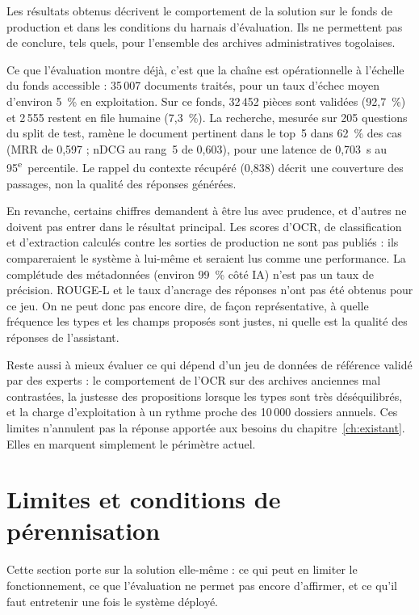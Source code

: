 Les résultats obtenus décrivent le comportement de la solution sur le fonds de production et dans les conditions du harnais d'évaluation. Ils ne permettent pas de conclure, tels quels, pour l'ensemble des archives administratives togolaises.

Ce que l'évaluation montre déjà, c'est que la chaîne est opérationnelle à l'échelle du fonds accessible : 35\,007 documents traités, pour un taux d'échec moyen d'environ 5~\% en exploitation. Sur ce fonds, 32\,452 pièces sont validées (92,7~\%) et 2\,555 restent en file humaine (7,3~\%). La recherche, mesurée sur 205 questions du split de test, ramène le document pertinent dans le top~5 dans 62~\% des cas (MRR de 0,597 ; nDCG au rang~5 de 0,603), pour une latence de 0,703~s au 95\textsuperscript{e}~percentile. Le rappel du contexte récupéré (0,838) décrit une couverture des passages, non la qualité des réponses générées.

En revanche, certains chiffres demandent à être lus avec prudence, et d'autres ne doivent pas entrer dans le résultat principal. Les scores d'OCR, de classification et d'extraction calculés contre les sorties de production ne sont pas publiés : ils compareraient le système à lui-même et seraient lus comme une performance. La complétude des métadonnées (environ 99~\% côté IA) n'est pas un taux de précision. ROUGE-L et le taux d'ancrage des réponses n'ont pas été obtenus pour ce jeu. On ne peut donc pas encore dire, de façon représentative, à quelle fréquence les types et les champs proposés sont justes, ni quelle est la qualité des réponses de l'assistant.

Reste aussi à mieux évaluer ce qui dépend d'un jeu de données de référence validé par des experts : le comportement de l'OCR sur des archives anciennes mal contrastées, la justesse des propositions lorsque les types sont très déséquilibrés, et la charge d'exploitation à un rythme proche des 10\,000 dossiers annuels. Ces limites n'annulent pas la réponse apportée aux besoins du chapitre~\ref{ch:existant}. Elles en marquent simplement le périmètre actuel.

\section{Limites et conditions de pérennisation}

Cette section porte sur la solution elle-même : ce qui peut en limiter le fonctionnement, ce que l'évaluation ne permet pas encore d'affirmer, et ce qu'il faut entretenir une fois le système déployé.

